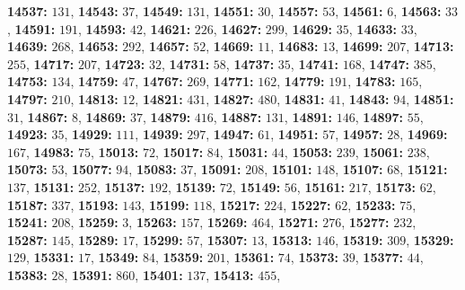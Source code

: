 \textsf{\bfseries 14537:} $131$, \textsf{\bfseries 14543:} $37$, \textsf{\bfseries 14549:} $131$, \textsf{\bfseries 14551:} $30$, \textsf{\bfseries 14557:} $53$, \textsf{\bfseries 14561:} $6$, \textsf{\bfseries 14563:} $33$, \textsf{\bfseries 14591:} $191$, \textsf{\bfseries 14593:} $42$, \textsf{\bfseries 14621:} $226$, \textsf{\bfseries 14627:} $299$, \textsf{\bfseries 14629:} $35$, \textsf{\bfseries 14633:} $33$, \textsf{\bfseries 14639:} $268$, \textsf{\bfseries 14653:} $292$, \textsf{\bfseries 14657:} $52$, \textsf{\bfseries 14669:} $11$, \textsf{\bfseries 14683:} $13$, \textsf{\bfseries 14699:} $207$, \textsf{\bfseries 14713:} $255$, \textsf{\bfseries 14717:} $207$, \textsf{\bfseries 14723:} $32$, \textsf{\bfseries 14731:} $58$, \textsf{\bfseries 14737:} $35$, \textsf{\bfseries 14741:} $168$, \textsf{\bfseries 14747:} $385$, \textsf{\bfseries 14753:} $134$, \textsf{\bfseries 14759:} $47$, \textsf{\bfseries 14767:} $269$, \textsf{\bfseries 14771:} $162$, \textsf{\bfseries 14779:} $191$, \textsf{\bfseries 14783:} $165$, \textsf{\bfseries 14797:} $210$, \textsf{\bfseries 14813:} $12$, \textsf{\bfseries 14821:} $431$, \textsf{\bfseries 14827:} $480$, \textsf{\bfseries 14831:} $41$, \textsf{\bfseries 14843:} $94$, \textsf{\bfseries 14851:} $31$, \textsf{\bfseries 14867:} $8$, \textsf{\bfseries 14869:} $37$, \textsf{\bfseries 14879:} $416$, \textsf{\bfseries 14887:} $131$, \textsf{\bfseries 14891:} $146$, \textsf{\bfseries 14897:} $55$, \textsf{\bfseries 14923:} $35$, \textsf{\bfseries 14929:} $111$, \textsf{\bfseries 14939:} $297$, \textsf{\bfseries 14947:} $61$, \textsf{\bfseries 14951:} $57$, \textsf{\bfseries 14957:} $28$, \textsf{\bfseries 14969:} $167$, \textsf{\bfseries 14983:} $75$, \textsf{\bfseries 15013:} $72$, \textsf{\bfseries 15017:} $84$, \textsf{\bfseries 15031:} $44$, \textsf{\bfseries 15053:} $239$, \textsf{\bfseries 15061:} $238$, \textsf{\bfseries 15073:} $53$, \textsf{\bfseries 15077:} $94$, \textsf{\bfseries 15083:} $37$, \textsf{\bfseries 15091:} $208$, \textsf{\bfseries 15101:} $148$, \textsf{\bfseries 15107:} $68$, \textsf{\bfseries 15121:} $137$, \textsf{\bfseries 15131:} $252$, \textsf{\bfseries 15137:} $192$, \textsf{\bfseries 15139:} $72$, \textsf{\bfseries 15149:} $56$, \textsf{\bfseries 15161:} $217$, \textsf{\bfseries 15173:} $62$, \textsf{\bfseries 15187:} $337$, \textsf{\bfseries 15193:} $143$, \textsf{\bfseries 15199:} $118$, \textsf{\bfseries 15217:} $224$, \textsf{\bfseries 15227:} $62$, \textsf{\bfseries 15233:} $75$, \textsf{\bfseries 15241:} $208$, \textsf{\bfseries 15259:} $3$, \textsf{\bfseries 15263:} $157$, \textsf{\bfseries 15269:} $464$, \textsf{\bfseries 15271:} $276$, \textsf{\bfseries 15277:} $232$, \textsf{\bfseries 15287:} $145$, \textsf{\bfseries 15289:} $17$, \textsf{\bfseries 15299:} $57$, \textsf{\bfseries 15307:} $13$, \textsf{\bfseries 15313:} $146$, \textsf{\bfseries 15319:} $309$, \textsf{\bfseries 15329:} $129$, \textsf{\bfseries 15331:} $17$, \textsf{\bfseries 15349:} $84$, \textsf{\bfseries 15359:} $201$, \textsf{\bfseries 15361:} $74$, \textsf{\bfseries 15373:} $39$, \textsf{\bfseries 15377:} $44$, \textsf{\bfseries 15383:} $28$, \textsf{\bfseries 15391:} $860$, \textsf{\bfseries 15401:} $137$, \textsf{\bfseries 15413:} $455$, 
